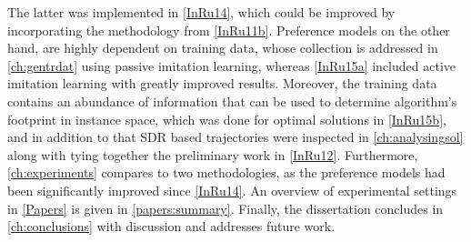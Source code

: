 The latter was implemented in \cref{InRu14}, which could be improved by 
incorporating the methodology from \cref{InRu11b}.
Preference models on  the other hand, are highly dependent on training data, 
whose collection is addressed in \cref{ch:gentrdat} using passive imitation 
learning, whereas \cref{InRu15a} included active imitation learning with 
greatly improved results. 
Moreover, the training data contains an abundance of information that can be 
used to determine algorithm's footprint in instance space, which was done for 
optimal solutions in \cref{InRu15b}, and in addition to that SDR based 
trajectories were inspected in \cref{ch:analysingsol} along with tying together 
the preliminary work in \cref{InRu12}. 
Furthermore, \cref{ch:experiments} compares to two methodologies, as the 
preference models had been significantly improved since \cref{InRu14}.
An overview of experimental settings in \cref{Papers} is given in 
\cref{papers:summary}. Finally, the dissertation concludes in 
\cref{ch:conclusions} with discussion and addresses future work.
    

